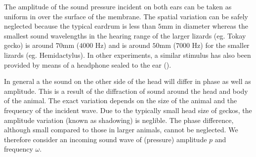 The amplitude of the sound pressure incident on both ears can be taken as uniform in over 
the surface of the membrane. The spatial variation can be safely neglected because the
typical eardrum is less than $5$mm in diameter whereas the smallest sound wavelengths
in the hearing range of the larger lizards (eg. Tokay gecko) is around $70$mm ($4000$ Hz) 
and is around $50$mm ($7000$ Hz) for the smaller lizards (eg. Hemidactylus). In other
experiments, a similar stimulus has also been provided by means of a headphone sealed
to the ear (\cite{koepplcarr1}).

In general a the sound on the other side of the head will differ in phase as well as amplitude. This is a result of the diffraction of 
sound around the head and body of the animal. The exact variation depends on the size of the animal and the frequency of the
incident wave. Due to the typically small head size of geckos, the amplitude variation 
(known as shadowing) is neglible. The phase difference, although small compared to those in larger animals, 
cannot be neglected. We therefore consider an incoming sound wave of (pressure) amplitude $p$ and frequency $\omega$. 

